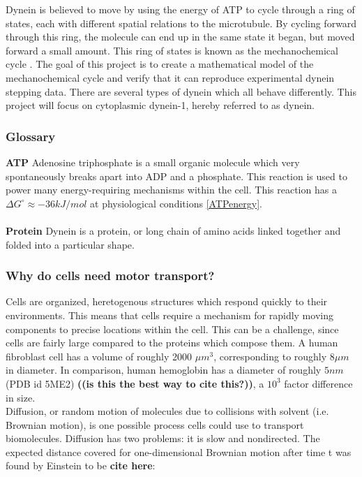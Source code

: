 \documentclass[10pt]{article} %
\begin{document}
Dynein is believed to move by using the energy of ATP to cycle through a ring of states, each with different spatial relations to the microtubule. By cycling forward through this ring, the molecule can end up in the same state it began, but moved forward a small amount. This ring of states is known as the mechanochemical cycle \cite{cianfroccoreview}. The goal of this project is to create a mathematical model of the mechanochemical cycle and verify that it can reproduce experimental dynein stepping data. There are several types of dynein which all behave differently. This project will focus on cytoplasmic dynein-1, hereby referred to as dynein.\\

\subsubsection{Glossary}
\textbf{ATP} Adenosine triphosphate is a small organic molecule which very spontaneously breaks apart into ADP and a phosphate. This reaction is used to power many energy-requiring mechanisms within the cell. This reaction has a $\Delta G^\circ \approx -36 kJ/mol$ at physiological conditions \ref{ATPenergy}.\\\\
\textbf{Protein} Dynein is a protein, or long chain of amino acids linked together and folded into a particular shape.\\

\subsubsection{Why do cells need motor transport?}
Cells are organized, heretogenous structures which respond quickly to their environments. This means that cells require a mechanism for rapidly moving components to precise locations within the cell. This can be a challenge, since cells are fairly large compared to the proteins which compose them. A human fibroblast cell has a volume of roughly 2000 $\mu m^3$\cite{fibroblastvolume}, corresponding to roughly $8 \mu m$ in diameter. In comparison, human hemoglobin has a diameter of roughly $5 nm$ (PDB id 5ME2) \textbf{((is this the best way to cite this?))}, a $10^3$ factor difference in size.\\

Diffusion, or random motion of molecules due to collisions with solvent (i.e. Brownian motion), is one possible process cells could use to transport biomolecules. Diffusion has two problems: it is slow and nondirected. The expected distance covered for one-dimensional Brownian motion after time t was found by Einstein to be \textbf{cite here}:
\end{document}
